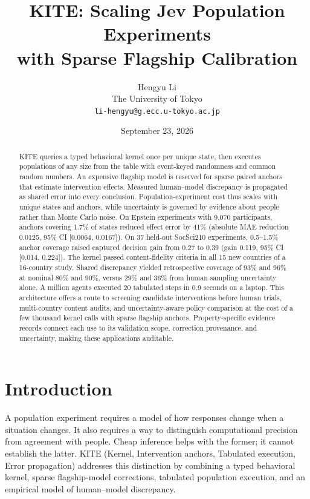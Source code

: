 \documentclass[11pt]{article}
\title{KITE: Scaling Jev Population Experiments\\with Sparse Flagship Calibration}
\author{Hengyu Li\\The University of Tokyo\\\texttt{li-hengyu@g.ecc.u-tokyo.ac.jp}}
\date{September 23, 2026}
\begin{document}
\maketitle
\begin{abstract}
KITE queries a typed behavioral kernel once per unique state, then executes populations of any size from the table with event-keyed randomness and common random numbers. An expensive flagship model is reserved for sparse paired anchors that estimate intervention effects. Measured human--model discrepancy is propagated as shared error into every conclusion. Population-experiment cost thus scales with unique states and anchors, while uncertainty is governed by evidence about people rather than Monte Carlo noise. On Epstein experiments with 9,070 participants, anchors covering 1.7\% of states reduced effect error by 41\% (absolute MAE reduction 0.0125, 95\% CI [0.0064, 0.0167]). On 37 held-out SocSci210 experiments, 0.5--1.5\% anchor coverage raised captured decision gain from 0.27 to 0.39 (gain 0.119, 95\% CI [0.014, 0.224]). The kernel passed content-fidelity criteria in all 15 new countries of a 16-country study. Shared discrepancy yielded retrospective coverage of 93\% and 96\% at nominal 80\% and 90\%, versus 29\% and 36\% from human sampling uncertainty alone. A million agents executed 20 tabulated steps in 0.9 seconds on a laptop. This architecture offers a route to screening candidate interventions before human trials, multi-country content audits, and uncertainty-aware policy comparison at the cost of a few thousand kernel calls with sparse flagship anchors. Property-specific evidence records connect each use to its validation scope, correction provenance, and uncertainty, making these applications auditable.
\end{abstract}

\section{Introduction}
A population experiment requires a model of how responses change when a situation changes. It also requires a way to distinguish computational precision from agreement with people. Cheap inference helps with the former; it cannot establish the latter. KITE (Kernel, Intervention anchors, Tabulated execution, Error propagation) addresses this distinction by combining a typed behavioral kernel, sparse flagship-model corrections, tabulated population execution, and an empirical model of human--model discrepancy.
\end{document}
